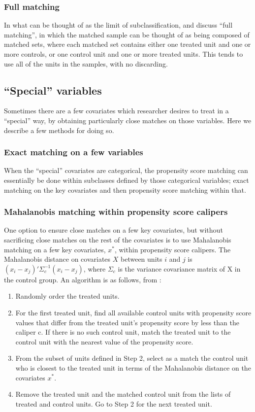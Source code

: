 \documentclass[11pt,titlepage]{article}
\begin{document}
\subsubsection{Full matching}
In what can be thought of as the limit of subclassification, \cite{Rosenbaum91a} and \cite{Hansen03} discuss ``full matching'', in which the matched sample can be
thought of as being composed of matched sets, where each matched set contains either one treated unit and one or more controls, or one control unit and one or more
treated units.  This tends to use all of the units in the samples, with no discarding.

\subsection{``Special'' variables}
Sometimes there are a few covariates which researcher desires to treat in a ``special'' way, by obtaining particularly close matches on those variables.
Here we describe a few methods for doing so.

\subsubsection{Exact matching on a few variables}
When the ``special'' covariates are categorical, the propensity score matching can essentially be done within subclasses defined by those categorical variables;
exact matching on the key covariates and then propensity score matching within that.

\subsubsection{Mahalanobis matching within propensity score calipers}
One option to ensure close matches on a few key covariates, but without sacrificing close matches on the rest of the covariates is to use Mahalanobis matching on
a few key covariates, $x^*$, within propensity score calipers.  
The Mahalanobis distance on covariates $X$ between units $i$ and $j$ is $(x_i-x_j)'\Sigma_{c}^{-1}(x_i-x_j)$, where $\Sigma_c$ is the variance covariance matrix of X in the
control group.  An algorithm is as follows, from \cite{RubTho00}:
\begin{enumerate}
\item Randomly order the treated units.
\item For the first treated unit, find all available control units with propensity score values that differ from the treated unit's propensity score by less than 
the caliper c.  If there is no such control unit, match the treated unit to the control unit with the nearest value of the propensity score.
\item From the subset of units defined in Step 2, select as a match the control unit who is closest to the treated unit in terms of the Mahalanobis distance
on the covariates $x^*$.  
\item Remove the treated unit and the matched control unit from the lists of treated and control units.  Go to Step 2 for the next treated unit.
\end{enumerate}
\end{document}
